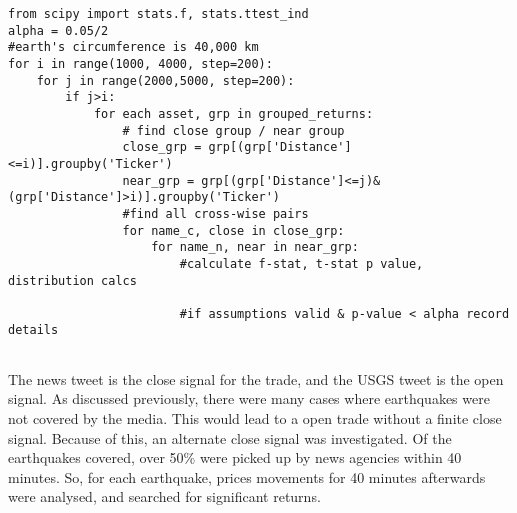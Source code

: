 \begin{lstlisting}[caption={Searching for significant pair trades}, captionpos=t, label={lst:pair_trades}]
from scipy import stats.f, stats.ttest_ind
alpha = 0.05/2
#earth's circumference is 40,000 km
for i in range(1000, 4000, step=200):
    for j in range(2000,5000, step=200):
        if j>i:
            for each asset, grp in grouped_returns:
                # find close group / near group
                close_grp = grp[(grp['Distance']<=i)].groupby('Ticker')
                near_grp = grp[(grp['Distance']<=j)&(grp['Distance']>i)].groupby('Ticker')
                #find all cross-wise pairs
                for name_c, close in close_grp:
                    for name_n, near in near_grp:
                        #calculate f-stat, t-stat p value, distribution calcs
                        
                        #if assumptions valid & p-value < alpha record details
                    
\end{lstlisting}

The news tweet is the close signal for the trade, and the USGS tweet is the open signal. As discussed previously, there were many cases where earthquakes were not covered by the media. This would lead to a open trade without a finite close signal. Because of this, an alternate close signal was investigated. Of the earthquakes covered, over 50\% were picked up by news agencies within 40 minutes. So, for each earthquake, prices movements for 40 minutes afterwards were analysed, and searched for significant returns.



